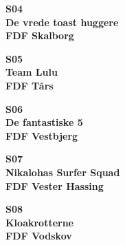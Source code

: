 \begin{center}
{\fontsize{300}{60}\selectfont\textbf{\textcolor{flammefarvet}{S04}}\\}
{\fontsize{30}{50}\selectfont\textbf{\textcolor{flammefarvet}{De vrede toast huggere}}\\}
{\fontsize{20}{50}\selectfont\textbf{FDF Skalborg}\\}
\end{center}
\newpage

\vspace*{2cm}
\begin{center}
{\fontsize{300}{60}\selectfont\textbf{\textcolor{flammefarvet}{S05}}\\}
{\fontsize{30}{50}\selectfont\textbf{\textcolor{flammefarvet}{Team Lulu}}\\}
{\fontsize{20}{50}\selectfont\textbf{FDF Tårs}\\}
\end{center}
\newpage

\vspace*{2cm}
\begin{center}
{\fontsize{300}{60}\selectfont\textbf{\textcolor{flammefarvet}{S06}}\\}
{\fontsize{30}{50}\selectfont\textbf{\textcolor{flammefarvet}{De fantastiske 5}}\\}
{\fontsize{20}{50}\selectfont\textbf{FDF Vestbjerg}\\}
\end{center}
\newpage

\vspace*{2cm}
\begin{center}
{\fontsize{300}{60}\selectfont\textbf{\textcolor{flammefarvet}{S07}}\\}
{\fontsize{30}{50}\selectfont\textbf{\textcolor{flammefarvet}{Nikalohas Surfer Squad}}\\}
{\fontsize{20}{50}\selectfont\textbf{FDF Vester Hassing}\\}
\end{center}
\newpage

\vspace*{2cm}
\begin{center}
{\fontsize{300}{60}\selectfont\textbf{\textcolor{flammefarvet}{S08}}\\}
{\fontsize{30}{50}\selectfont\textbf{\textcolor{flammefarvet}{Kloakrotterne}}\\}
{\fontsize{20}{50}\selectfont\textbf{FDF Vodskov}\\}
\end{center}
\newpage

